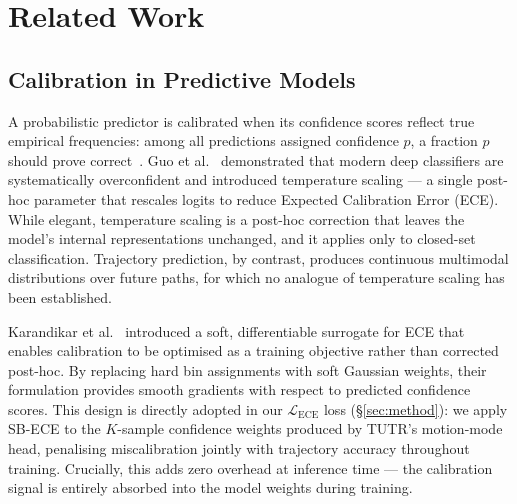 \documentclass{article}
\begin{document}

\section{Related Work}
\label{sec:related}

\subsection{Calibration in Predictive Models}

A probabilistic predictor is calibrated when its confidence scores reflect
true empirical frequencies: among all predictions assigned confidence \(p\),
a fraction \(p\) should prove correct~\cite{guo2017calibration}.
Guo et al.~\cite{guo2017calibration} demonstrated that modern deep classifiers
are systematically overconfident and introduced temperature scaling --- a
single post-hoc parameter that rescales logits to reduce Expected Calibration
Error (ECE).
While elegant, temperature scaling is a post-hoc correction that leaves the
model's internal representations unchanged, and it applies only to closed-set
classification.
Trajectory prediction, by contrast, produces continuous multimodal
distributions over future paths, for which no analogue of temperature scaling
has been established.

Karandikar et al.~\cite{karandikar2021soft} introduced a soft, differentiable
surrogate for ECE that enables calibration to be optimised as a training
objective rather than corrected post-hoc.
By replacing hard bin assignments with soft Gaussian weights, their formulation
provides smooth gradients with respect to predicted confidence scores.
This design is directly adopted in our \(\mathcal{L}_{\text{ECE}}\) loss
(\S\ref{sec:method}): we apply SB-ECE to the \(K\)-sample confidence weights
produced by TUTR's motion-mode head, penalising miscalibration jointly with
trajectory accuracy throughout training.
Crucially, this adds zero overhead at inference time --- the calibration signal
is entirely absorbed into the model weights during training.
\end{document}
